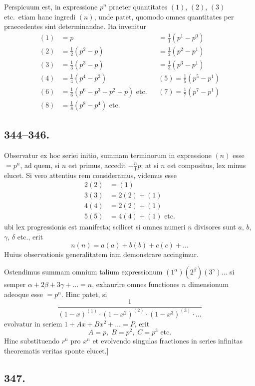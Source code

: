 \documentclass[12pt]{article}
\begin{document}
Perspicuum est, in expressione $p^n$ praeter quantitates $(1)$, $(2)$, $(3)$ etc.~etiam hanc ingredi $(n)$, unde patet, quomodo omnes quantitates per praecedentes sint determinandae. Ita invenitur
\[
\begin{aligned}
(1) &= p &&= \tfrac{1}{1}(p^1-p^0)\\
(2) &= \tfrac{1}{2}(p^2-p) &&= \tfrac{1}{2}(p^2-p^1)\\
(3) &= \tfrac{1}{3}(p^3-p) &&= \tfrac{1}{3}(p^3-p^1)\\
(4) &= \tfrac{1}{4}(p^4-p^2) && (5) = \tfrac{1}{5}(p^5-p^1)\\
(6) &= \tfrac{1}{6}(p^6-p^3-p^2+p) \text{ etc.} && (7) = \tfrac{1}{7}(p^7-p^1)\\
(8) &= \tfrac{1}{8}(p^8-p^4) \text{ etc.}
\end{aligned}
\]

\subsection*{344--346.}

Observatur ex hoc seriei initio, summam terminorum in expressione $(n)$ esse $=p^n$, ad quem, si $n$ est primus, accedit $-\frac{n}{1}p$; at si $n$ est compositus, lex minus elucet. Si vero attentius rem consideramus, videmus esse
\[
\begin{aligned}
2(2) &= (1)\\
3(3) &= 2(2) + (1)\\
4(4) &= 2(2) + (1)\\
5(5) &= 4(4) + (1) \text{ etc.}
\end{aligned}
\]
ubi lex progressionis est manifesta; scilicet si omnes numeri $n$ divisores sunt $a$, $b$, $\gamma$, $\delta$ etc., erit
\[
n(n) = a(a) + b(b) + c(c) + \ldots
\]
Huius observationis generalitatem iam demonstrare accingimur.

Ostendimus summam omnium talium expressionum $(1^\alpha)(2^\beta)(3^\gamma)\ldots$ si semper $\alpha+2\beta+3\gamma+\ldots=n$, exhaurire omnes functiones $n$ dimensionum adeoque esse $=p^n$. Hinc patet, si
\[
\frac{1}{(1-x)^{(1)}\cdot (1-x^2)^{(2)}\cdot (1-x^3)^{(3)}\cdot \ldots}
\]
evolvatur in seriem $1+Ax+Bx^2+\ldots=P$, erit
\[
A=p,\; B=p^2,\; C=p^3 \text{ etc.}
\]
Hinc substituendo $r^n$ pro $x^n$ et evolvendo singulas fractiones in series infinitas theorematis veritas sponte elucet.]

\subsection*{347.}
\end{document}
